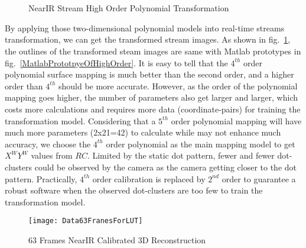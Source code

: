 %
\\\indent
\begin{figure}[!t]
\centering
\hspace*{-0.3cm}
%
%
\\%
\hspace*{-0.3cm}
%
%
\caption{NearIR Stream High Order Polynomial Transformation}
\label{HighOrderNearIRRectification}
\end{figure}%
%
By applying those two-dimensional polynomial models into real-time streams transformation, we can get the transformed stream images. As shown in fig.~\ref{HighOrderNearIRRectification}, the outlines of the transformed steam images are same with Matlab prototypes in fig.~\ref{MatlabPrototpyeOfHighOrder}. It is easy to tell that the \(4^{th}\) order polynomial surface mapping is much better than the second order, and a higher order than \(4^{th}\) should be more accurate. However, as the order of the polynomial mapping goes higher, the number of parameters also get larger and larger, which costs more calculations and requires more data (coordinate-pairs) for training the transformation model. Considering that a \(5^{th}\) order polynomial mapping will have much more  parameters (2x21=42) to calculate while may not enhance much accuracy, we choose the \(4^{th}\) order polynomial as the main mapping model to get \(X^WY^W\) values from \(RC\). Limited by the static dot pattern, fewer and fewer dot-clusters could be observed by the camera as the camera getting closer to the dot pattern. Practically, \(4^{th}\) order calibration is replaced by \(2^{nd}\) order to guarantee a robust software when the observed dot-clusters are too few to train the transformation model.
\\\indent
%
\begin{figure}[t]
\centering
\texttt{[image: Data63FranesForLUT]}
\caption{63 Frames NearIR Calibrated 3D Reconstruction}
\label{Data63FranesForLUT}
\end{figure}%
